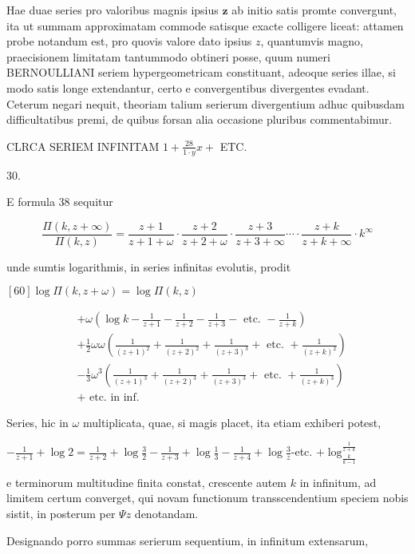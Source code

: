 \documentclass[10pt]{article}
\begin{document}
Hae duae series pro valoribus magnis ipsius \(\boldsymbol{z}\) ab initio satis promte convergunt, ita ut summam approximatam commode satisque exacte colligere liceat: attamen probe notandum est, pro quovis valore dato ipsius \(z\), quantumvis magno, praecisionem limitatam tantummodo obtineri posse, quum numeri BERNOULLIANI seriem hypergeometricam constituant, adeoque series illae, si modo satis longe extendantur, certo e convergentibus divergentes evadant. Ceterum negari nequit, theoriam talium serierum divergentium adhuc quibusdam difficultatibus premi, de quibus forsan alia occasione pluribus commentabimur.

CLRCA SERIEM INFINITAM \(1+\frac{28}{1 \cdot y} x+\) ETC.

30.

E formula 38 sequitur

\[
\frac{\Pi(k, z+\infty)}{\Pi(k, z)}=\frac{z+1}{z+1+\omega} \cdot \frac{z+2}{z+2+\omega} \cdot \frac{z+3}{z+3+\infty} \cdots \cdot \frac{z+k}{z+k+\infty} \cdot k^{\infty}
\]

unde sumtis logarithmis, in series infinitas evolutis, prodit

\([60] \log \Pi(k, z+\omega)=\log \Pi(k, z)\)

\[
\begin{aligned}
& +\omega\left(\log k-\frac{1}{z+1}-\frac{1}{z+2}-\frac{1}{z+3}-\text { etc. }-\frac{1}{z+k}\right) \\
& +\frac{1}{2} \omega \omega\left(\frac{1}{(z+1)^{2}}+\frac{1}{(z+2)^{2}}+\frac{1}{(z+3)^{3}}+\text { etc. }+\frac{1}{(z+k)^{2}}\right) \\
& -\frac{1}{3} \omega^{3}\left(\frac{1}{(z+1)^{3}}+\frac{1}{(z+2)^{3}}+\frac{1}{(z+3)^{3}}+\text { etc. }+\frac{1}{(z+k)^{3}}\right) \\
& + \text { etc. in inf. }
\end{aligned}
\]

Series, hic in \(\omega\) multiplicata, quae, si magis placet, ita etiam exhiberi potest,

\(-\frac{1}{z+1}+\log 2=\frac{1}{z+2}+\log \frac{3}{2}-\frac{1}{z+3}+\log \frac{1}{3}-\frac{1}{z+4}+\log \frac{3}{z}\)-etc. \(+\log _{\frac{k}{k-1}}^{\frac{1}{z+k}}\)

e terminorum multitudine finita constat, crescente autem \(k\) in infinitum, ad limitem certum converget, qui novam functionum transscendentium speciem nobis sistit, in posterum per \(\Psi z\) denotandam.

Designando porro summas serierum sequentium, in infinitum extensarum,
\end{document}
